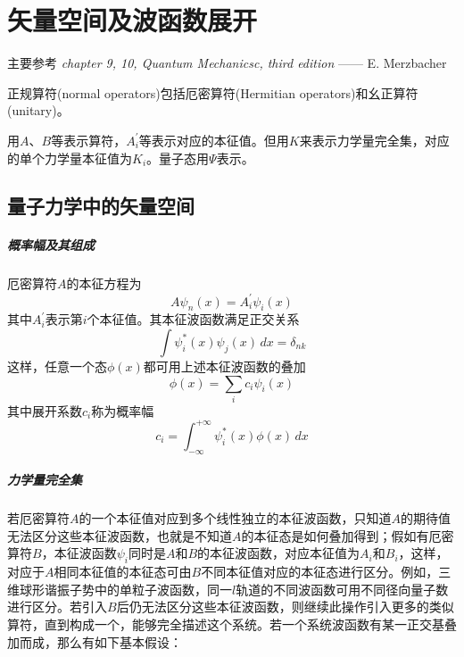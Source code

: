 \chapter{矢量空间及波函数展开}
主要参考 \textit{chapter 9, 10, Quantum Mechanicsc, third edition} —— E. Merzbacher


正规算符(normal operators)包括厄密算符(Hermitian operators)和幺正算符(unitary)。


用$A$、$B$等表示算符，$A^{\prime}_{i}$等表示对应的本征值。但用$K$来表示力学量完全集，对应的单个力学量本征值为$K_{i}$。量子态用$\Psi$表示。
\section{量子力学中的矢量空间}

\paragraph*{概率幅及其组成}
厄密算符$A$的本征方程为
\begin{equation}
    A \psi_n(x) = A_i^{\prime} \psi_i(x)
\end{equation}
其中$A^{\prime}_{i}$表示第$i$个本征值。其本征波函数满足正交关系
\begin{equation}
    \int \psi_{i}^{\ast}(x) \psi_j(x)\, dx = \delta_{nk}
\end{equation}
这样，任意一个态$\phi(x)$都可用上述本征波函数的叠加
\begin{equation}
    \phi(x) = \sum_{i} c_{i} \psi_i (x)
\end{equation}
其中展开系数$c_i$称为概率幅
\begin{equation}
    c_i = \int_{-\infty}^{+\infty} \psi_i^{\ast}(x) \phi(x) \, dx
\end{equation}

\paragraph*{力学量完全集}
若厄密算符$A$的一个本征值对应到多个线性独立的本征波函数，只知道$A$的期待值无法区分这些本征波函数，也就是不知道$A$的本征态是如何叠加得到；假如有厄密算符$B$，本征波函数$\psi_i$同时是$A$和$B$的本征波函数，对应本征值为$A_i$和$B_i$，这样，对应于$A$相同本征值的本征态可由$B$不同本征值对应的本征态进行区分。例如，三维球形谐振子势中的单粒子波函数，同一$l$轨道的不同波函数可用不同径向量子数进行区分。若引入$B$后仍无法区分这些本征波函数，则继续此操作引入更多的类似算符，直到构成一个，能够完全描述这个系统。若一个系统波函数有某一正交基叠加而成，那么有如下基本假设：
\begin{center}
\end{center}

